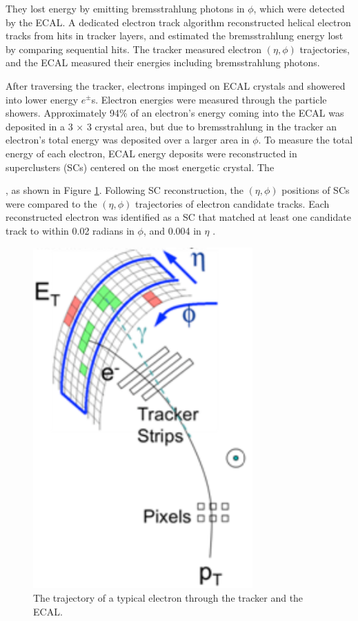 
They lost energy by emitting bremsstrahlung photons in $\phi$, which were detected 
by the ECAL.  A dedicated electron track algorithm reconstructed helical electron tracks from hits in tracker 
layers, and estimated the bremsstrahlung energy lost by comparing sequential hits.  The tracker measured 
electron $(\eta, \phi)$ trajectories, and the ECAL measured their energies including bremsstrahlung photons.

After traversing the tracker, electrons impinged on ECAL crystals and showered into lower energy $e^{\pm}$s.  
Electron energies were measured through the particle showers.  Approximately 94\% of an electron's energy coming 
into the ECAL was deposited in a 3 $\times$ 3 crystal area, but due to bremsstrahlung in the tracker an electron's 
total energy was deposited over a larger area in $\phi$.  To measure the total energy of each electron, ECAL energy 
deposits were reconstructed in superclusters (SCs) centered on the most energetic crystal.  The 

, as shown in Figure 
\ref{fig:eleTrackAndSC}.  Following SC reconstruction, the $(\eta, \phi)$ positions of SCs were compared to the 
$(\eta, \phi)$ trajectories of electron candidate tracks.  Each reconstructed electron was identified as a SC that 
matched at least one candidate track to within 0.02 radians in $\phi$, and 0.004 in $\eta$ \cite{ecalPerformanceInCollisions}.

\begin{figure}[h]
	\centering
	\includegraphics[width=0.75\textwidth]{figures/electronTrackAndSupercluster.png}
	\caption{The trajectory of a typical electron through the tracker and the ECAL.}
	\label{fig:eleTrackAndSC}
\end{figure}



